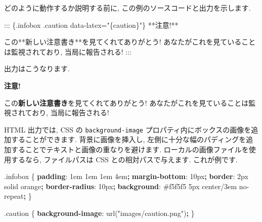 \documentclass[
  11pt,
]{bxjsreport}
\newenvironment{Shaded}{\begin{snugshade}}{\end{snugshade}}
\newcommand{\ConstantTok}[1]{\textcolor[rgb]{0.00,0.00,0.00}{#1}}
\newcommand{\DataTypeTok}[1]{\textcolor[rgb]{0.13,0.29,0.53}{#1}}
\newcommand{\DecValTok}[1]{\textcolor[rgb]{0.00,0.00,0.81}{#1}}
\newcommand{\FunctionTok}[1]{\textcolor[rgb]{0.00,0.00,0.00}{#1}}
\newcommand{\KeywordTok}[1]{\textcolor[rgb]{0.13,0.29,0.53}{\textbf{#1}}}
\newcommand{\NormalTok}[1]{#1}
\newcommand{\OperatorTok}[1]{\textcolor[rgb]{0.81,0.36,0.00}{\textbf{#1}}}
\newcommand{\StringTok}[1]{\textcolor[rgb]{0.31,0.60,0.02}{#1}}
\newenvironment{blackbox}{
  \definecolor{shadecolor}{rgb}{0, 0, 0}  %
  \color{white}
  \begin{shaded}}
 {\end{shaded}}
\newenvironment{infobox}[1]
  {
  \begin{itemize}
  \renewcommand{\labelitemi}{
    \raisebox{-.7\height}[0pt][0pt]{
      {\setkeys{Gin}{width=3em,keepaspectratio}
        \texttt{[image: images/\#1]}}
    }
  }
  \setlength{\fboxsep}{1em}
  \begin{blackbox}
  \item
  }
  {
  \end{blackbox}
  \end{itemize}
  }
\begin{document}
どのように動作するか説明する前に, この例のソースコードと出力を示します.

\begin{Shaded}
\begin{Highlighting}[]
\NormalTok{::: \{.infobox .caution data{-}latex="\{caution\}"\}}
\NormalTok{**注意!**}

\NormalTok{この**新しい注意書き**を見てくれてありがとう! あなたがこれを見ていることは監視されており, 当局に報告される!}
\NormalTok{:::}
\end{Highlighting}
\end{Shaded}

出力はこうなります.

\begin{infobox}{caution}
\textbf{注意!}

この\textbf{新しい注意書き}を見てくれてありがとう! あなたがこれを見ていることは監視されており, 当局に報告される!

\end{infobox}

HTML 出力では, CSS の \texttt{background-image} プロパティ内にボックスの画像を追加することができます. 背景に画像を挿入し, 左側に十分な幅のパディングを追加することでテキストと画像の重なりを避けます. ローカルの画像ファイルを使用するなら, ファイルパスは CSS との相対パスで与えます. これが例です.

\begin{Shaded}
\begin{Highlighting}[]
\FunctionTok{.infobox}\NormalTok{ \{}
  \KeywordTok{padding}\NormalTok{: }\DecValTok{1}\DataTypeTok{em} \DecValTok{1}\DataTypeTok{em} \DecValTok{1}\DataTypeTok{em} \DecValTok{4}\DataTypeTok{em}\OperatorTok{;}
  \KeywordTok{margin{-}bottom}\NormalTok{: }\DecValTok{10}\DataTypeTok{px}\OperatorTok{;}
  \KeywordTok{border}\NormalTok{: }\DecValTok{2}\DataTypeTok{px} \DecValTok{solid} \ConstantTok{orange}\OperatorTok{;}
  \KeywordTok{border{-}radius}\NormalTok{: }\DecValTok{10}\DataTypeTok{px}\OperatorTok{;}
  \KeywordTok{background}\NormalTok{: }\ConstantTok{\#f5f5f5} \DecValTok{5}\DataTypeTok{px} \DecValTok{center}\NormalTok{/}\DecValTok{3}\DataTypeTok{em} \DecValTok{no{-}repeat}\OperatorTok{;}
\NormalTok{\}}

\FunctionTok{.caution}\NormalTok{ \{}
  \KeywordTok{background{-}image}\NormalTok{: }\FunctionTok{url(}\StringTok{"images/caution.png"}\FunctionTok{)}\OperatorTok{;}
\NormalTok{\}}
\end{Highlighting}
\end{Shaded}
\end{document}
